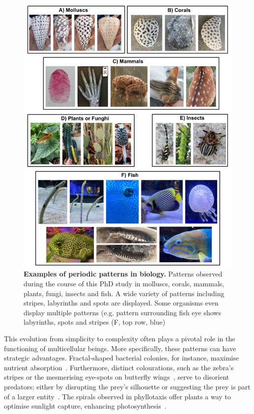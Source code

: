 \begin{figure}[h!]
    \centering
    \includegraphics[width=1\textwidth]{chapters/Introduction/pattern_examples}
    \caption{\textbf{Examples of periodic patterns in biology.} Patterns observed during the course of this PhD study in molluscs, corals, mammals, plants, fungi, insects and fish. A wide variety of patterns including stripes, labyrinths and spots are displayed. Some organisms even display multiple patterns (e.g. pattern surrounding fish eye shows labyrinths, spots and stripes (F, top row, blue)}
    \label{fig:pattern_examples}
\end{figure}
This evolution from simplicity to complexity often plays a pivotal role in the functioning of multicellular beings.
More specifically, these patterns can have strategic advantages.
Fractal-shaped bacterial colonies, for instance, maximise nutrient absorption~\parencite{Matsushita1990}.
Furthermore, distinct colourations, such as the zebra's stripes or the mesmerising eye-spots on butterfly wings~\parencite{Blest}, serve to disorient predators; either by disrupting the prey's silhouette or suggesting the prey is part of a larger entity~\parencite{Stevens2006}.
The spirals observed in phyllotaxis offer plants a way to optimise sunlight capture, enhancing photosynthesis~\parencite{Strauss2020}.

